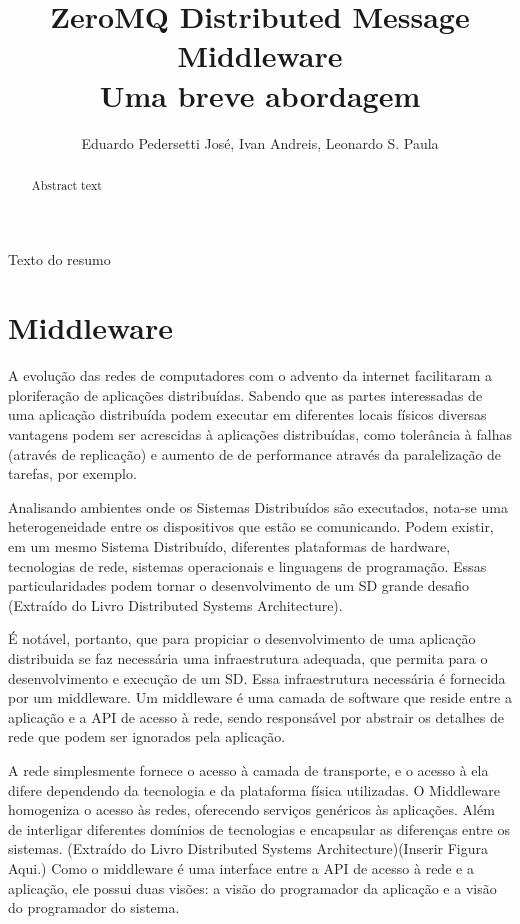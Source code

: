 \documentclass[12pt]{article}
\title{ZeroMQ Distributed Message Middleware\\Uma breve abordagem}
\author{Eduardo Pedersetti José\inst{1}, Ivan Andreis\inst{1}, Leonardo S. Paula\inst{1}}
\begin{document}
 

\maketitle

\begin{abstract}
  Abstract text
\end{abstract}
     
\begin{resumo} 
  Texto do resumo
\end{resumo}

\section{Middleware}
A evolução das redes de computadores com o advento da internet facilitaram a ploriferação 
de aplicações distribuídas. Sabendo que as partes interessadas de uma aplicação distribuída
podem executar em diferentes locais físicos diversas vantagens podem ser acrescidas à aplicações
distribuídas, como tolerância à falhas (através de replicação) e aumento de de performance através
da paralelização de tarefas, por exemplo.

Analisando ambientes onde os Sistemas Distribuídos são executados, nota-se uma heterogeneidade
entre os dispositivos que estão se comunicando. Podem existir, em um mesmo Sistema Distribuído, diferentes plataformas de hardware, tecnologias de rede, sistemas operacionais e linguagens de programação. Essas particularidades podem tornar o desenvolvimento de um SD grande desafio  (Extraído do Livro Distributed Systems Architecture).

É notável, portanto, que para propiciar o desenvolvimento de uma aplicação distribuida se faz necessária uma infraestrutura adequada, que permita para o desenvolvimento e execução de um SD. Essa infraestrutura necessária é fornecida por um middleware. Um middleware é uma camada de software que reside entre a aplicação e a API de acesso à rede, sendo responsável por abstrair os detalhes de rede que podem ser ignorados pela aplicação.

A rede simplesmente fornece o acesso à camada de transporte, e o acesso à ela difere dependendo da tecnologia e da plataforma física utilizadas. O Middleware homogeniza o acesso às redes, oferecendo serviços genéricos às aplicações. Além de interligar diferentes domínios de tecnologias e encapsular as diferenças entre os sistemas. (Extraído do Livro Distributed Systems Architecture)(Inserir Figura Aqui.)
Como o middleware é uma interface entre a API de acesso à rede e a aplicação, ele possui duas visões: a visão do programador da aplicação e a visão do programador do sistema.
\end{document}
